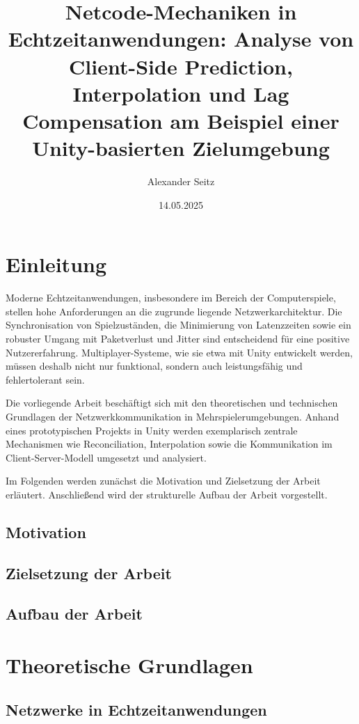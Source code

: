 \documentclass{article}
\title{Netcode-Mechaniken in Echtzeitanwendungen: Analyse von Client-Side Prediction, Interpolation und Lag Compensation am Beispiel einer Unity-basierten Zielumgebung}
\author{Alexander Seitz}
\date{14.05.2025}
\begin{document}
\maketitle
\newpage

\tableofcontents
\newpage

\section{Einleitung}
Moderne Echtzeitanwendungen, insbesondere im Bereich der Computerspiele, stellen hohe Anforderungen an die zugrunde liegende Netzwerkarchitektur. Die Synchronisation von Spielzuständen, die Minimierung von Latenzzeiten sowie ein robuster Umgang mit Paketverlust und Jitter sind entscheidend für eine positive Nutzererfahrung. Multiplayer-Systeme, wie sie etwa mit Unity entwickelt werden, müssen deshalb nicht nur funktional, sondern auch leistungsfähig und fehlertolerant sein.

Die vorliegende Arbeit beschäftigt sich mit den theoretischen und technischen Grundlagen der Netzwerkkommunikation in Mehrspielerumgebungen. Anhand eines prototypischen Projekts in Unity werden exemplarisch zentrale Mechanismen wie Reconciliation, Interpolation sowie die Kommunikation im Client-Server-Modell umgesetzt und analysiert.

Im Folgenden werden zunächst die Motivation und Zielsetzung der Arbeit erläutert. Anschließend wird der strukturelle Aufbau der Arbeit vorgestellt.

\subsection{Motivation}

\subsection{Zielsetzung der Arbeit}
\subsection{Aufbau der Arbeit}

\section{Theoretische Grundlagen}
\subsection{Netzwerke in Echtzeitanwendungen}
\end{document}
